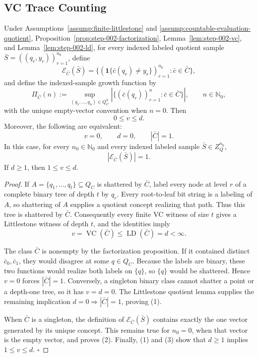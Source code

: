 \subsection{VC Trace Counting}\label{app:step_005}


\begin{lemma}\label{lem:step-005-branches}
Under Assumptions~\ref{assump:finite-littlestone} and
\ref{assump:countable-evaluation-quotient}, Proposition~\ref{prop:step-002-factorization},
Lemma~\ref{lem:step-002-vc}, and Lemma~\ref{lem:step-002-ld},
for every indexed labeled quotient sample
\(\bar S=((q_r,y_r))_{r=1}^{n_0}\), define
\[
\mathcal E_{\bar C}(\bar S)
=\{(\mathbf1\{\bar c(q_r)\ne y_r\})_{r=1}^{n_0}:\bar c\in\bar C\},
\]
and define the indexed-sample growth function by
\[
\Pi_{\bar C}(n)
:=\sup_{(q_1,\ldots,q_n)\in Q_C^n}
\left|\{(\bar c(q_r))_{r=1}^n:\bar c\in\bar C\}\right|,
\qquad n\in\mathbb N_0,
\]
with the unique empty-vector convention when \(n=0\). Then
\[
0\le v\le d.
\]
Moreover, the following are equivalent:
\[
v=0,\qquad d=0,\qquad |\bar C|=1.
\tag{1}
\]
In this case, for every \(n_0\in\mathbb N_0\) and every indexed labeled
sample \(\bar S\in Z_Q^{n_0}\),
\[
|\mathcal E_{\bar C}(\bar S)|=1.
\tag{2}
\]
If \(d\ge1\), then \(1\le v\le d\).


\end{lemma}

\begin{proof}
If \(A=\{q_1,\ldots,q_t\}\subseteq Q_C\) is shattered by
\(\bar C\), label every node at level \(r\) of a complete binary tree of
depth \(t\) by \(q_r\).  Every root-to-leaf bit string is a labeling of
\(A\), so shattering of \(A\) supplies a quotient concept realizing that
path.  Thus this tree is shattered by \(\bar C\).  Consequently every
finite VC witness of size \(t\) gives a Littlestone witness of depth \(t\),
and the  identities imply
\[
v=\operatorname{VC}(\bar C)
\le \operatorname{LD}(\bar C)=d<\infty.
\tag{3}
\]

The class \(\bar C\) is nonempty by the  factorization proposition.
If it contained distinct \(\bar c_0,\bar c_1\), they would disagree at some
\(q\in Q_C\).  Because the labels are binary, these two functions would
realize both labels on \(\{q\}\), so \(\{q\}\) would be shattered.  Hence
\(v=0\) forces \(|\bar C|=1\).  Conversely, a singleton binary class cannot
shatter a point or a depth-one tree, so it has \(v=d=0\).  The 
Littlestone quotient lemma supplies the remaining implication
\(d=0\Rightarrow|\bar C|=1\), proving (1).

When \(\bar C\) is a singleton, the definition of
\(\mathcal E_{\bar C}(\bar S)\) contains exactly the one vector generated by
its unique concept.  This remains true for \(n_0=0\), when that vector is
the empty vector, and proves (2).  Finally, (1) and (3) show that \(d\ge1\)
implies \(1\le v\le d\). \(\square\)


\end{proof}

